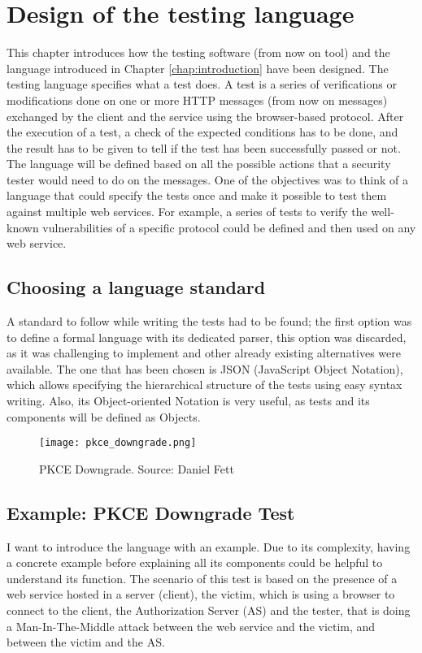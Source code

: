 \chapter{Design of the testing language}
\label{chap:Design}
This chapter introduces how the testing software (from now on tool) and the language introduced in Chapter \ref{chap:introduction} have been designed. The testing language specifies what a test does. A test is a series of verifications or modifications done on one or more HTTP messages (from now on messages) exchanged by the client and the service using the browser-based protocol. After the execution of a test, a check of the expected conditions has to be done, and the result has to be given to tell if the test has been successfully passed or not. The language will be defined based on all the possible actions that a security tester would need to do on the messages. 
One of the objectives was to think of a language that could specify the tests once and make it possible to test them against multiple web services. For example, a series of tests to verify the well-known vulnerabilities of a specific protocol could be defined and then used on any web service.

\section{Choosing a language standard}
A standard to follow while writing the tests had to be found; the first option was to define a formal language with its dedicated parser, this option was discarded, as it was challenging to implement and other already existing alternatives were available. 
The one that has been chosen is JSON (JavaScript Object Notation), which allows specifying the hierarchical structure of the tests using easy syntax writing. Also, its Object-oriented Notation is very useful, as tests and its components will be defined as Objects.

\begin{figure}[h]
    \texttt{[image: pkce\_downgrade.png]}
    \caption{PKCE Downgrade. Source: Daniel Fett \cite{pkce_msc_image}}
    \label{fig:pkce_downgrade}
\end{figure}

\section{Example: PKCE Downgrade Test} 
\label{sec:pkce_downgrade}

I want to introduce the language with an example. Due to its complexity, having a concrete example before explaining all its components could be helpful to understand its function.
The scenario of this test is based on the presence of a web service hosted in a server (client), the victim, which is using a browser to connect to the client, the Authorization Server (AS) and the tester, that is doing a Man-In-The-Middle attack between the web service and the victim, and between the victim and the AS.
 

